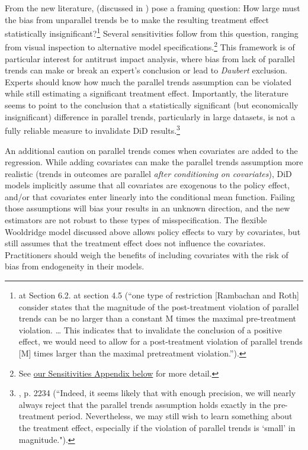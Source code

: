 \documentclass[12pt]{article}
\begin{document}
From the new literature, \citet{rambachan2023more} (discussed in \citet{roth2023s}) pose a framing question: How large must the bias from unparallel trends be to make the resulting treatment effect statistically insignificant?\footnote{\citet{rambachan2023more} at Section 6.2. \citet{roth2023s} at section 4.5 (“one type of restriction [Rambachan and Roth] consider states that the magnitude of the post-treatment violation of parallel trends can be no larger than a constant M times the maximal pre-treatment violation. … This indicates that to invalidate the conclusion of a positive effect, we would need to allow for a post-treatment violation of parallel trends [M] times larger than the maximal pretreatment violation.”).}  Several sensitivities follow from this question, ranging from visual inspection to alternative model specifications.\footnote{See \hyperref[sec:appendixa]{our Sensitivities Appendix below} for more detail.}  This framework is of particular interest for antitrust impact analysis, where bias from lack of parallel trends can make or break an expert’s conclusion or lead to \textit{Daubert} exclusion. Experts should know how much the parallel trends assumption can be violated while still estimating a significant treatment effect. Importantly, the literature seems to point to the conclusion that a statistically significant (but economically insignificant) difference in parallel trends, particularly in large datasets, is not a fully reliable measure to invalidate DiD results.\footnote{\citet{roth2023s}, p. 2234 (``Indeed, it seems likely that with enough precision, we will nearly always reject that the parallel trends assumption holds exactly in the pre-treatment period. Nevertheless, we may still wish to learn something about the treatment effect, especially if the violation of parallel trends is `small’ in
magnitude.").}

An additional caution on parallel trends comes when covariates are added to the regression. While adding covariates can make the parallel trends assumption more realistic (trends in outcomes are parallel \textit{after conditioning on covariates}), DiD models implicitly assume that all covariates are exogenous to the policy effect, and/or that covariates enter linearly into the conditional mean function. Failing those assumptions will bias your results in an unknown direction, and the new estimators are not robust to these types of misspecification. The flexible Wooldridge model discussed above allows policy effects to vary by covariates, but still assumes that the treatment effect does not influence the covariates. Practitioners should weigh the benefits of including covariates with the risk of bias from endogeneity in their models.
\end{document}

